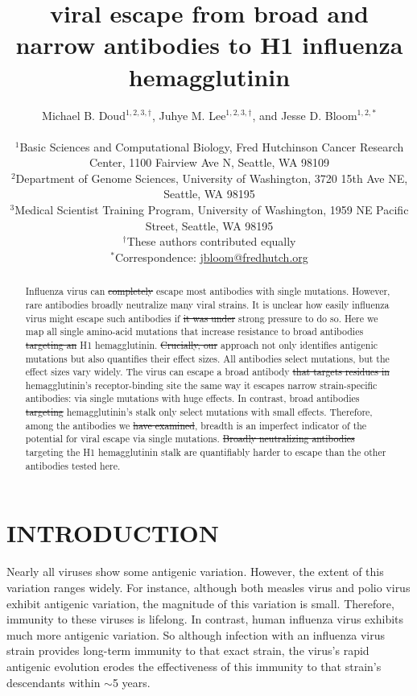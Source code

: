 \documentclass[11pt]{article}
\title{\DIFdelbegin \DIFdel{Quantifying the effects of single mutations on }\DIFdelend \DIFaddbegin \DIFadd{How single mutations affect }\DIFaddend viral escape from broad and narrow antibodies to \DIFdelbegin \DIFdel{an }\DIFdelend H1 influenza hemagglutinin}
\author
{Michael B. Doud$^{1,2,3,\dagger}$, Juhye M. Lee$^{1,2,3,\dagger}$, and Jesse D. Bloom$^{1,2,*}$\\
\\
\scriptsize{$^1$Basic Sciences and Computational Biology, Fred Hutchinson Cancer Research Center, 1100 Fairview Ave N, Seattle, WA  98109}\\ %
\scriptsize{$^2$Department of Genome Sciences, University of Washington, 3720 15th Ave NE, Seattle, WA  98195} \\ %
\scriptsize{$^3$Medical Scientist Training Program, University of Washington, 1959 NE Pacific Street, Seattle, WA  98195} \\ %
\scriptsize{$^{\dagger}$These authors contributed equally} \\
\scriptsize{$^*$Correspondence: \href{jbloom@fredhutch.org}{jbloom@fredhutch.org}}
}
\date{}
\providecommand{\DIFaddtex}[1]{{\protect\color{blue}\uwave{#1}}} %
\providecommand{\DIFdeltex}[1]{{\protect\color{red}\sout{#1}}}                      %
\providecommand{\DIFaddbegin}{} %
\providecommand{\DIFaddend}{} %
\providecommand{\DIFdelbegin}{} %
\providecommand{\DIFdelend}{} %
\providecommand{\DIFadd}[1]{\texorpdfstring{\DIFaddtex{#1}}{#1}} %
\providecommand{\DIFdel}[1]{\texorpdfstring{\DIFdeltex{#1}}{}} %
\begin{document}
\maketitle
\onehalfspacing

\begin{abstract}
Influenza virus can \DIFdelbegin \DIFdel{completely }\DIFdelend escape most antibodies with single mutations.
However, rare antibodies broadly neutralize many viral strains.
It is unclear how easily influenza virus might escape such antibodies if \DIFdelbegin \DIFdel{it was under }\DIFdelend \DIFaddbegin \DIFadd{there was }\DIFaddend strong pressure to do so.
Here we map all single amino-acid mutations that increase resistance to broad antibodies \DIFdelbegin \DIFdel{targeting an }\DIFdelend \DIFaddbegin \DIFadd{to }\DIFaddend H1 hemagglutinin.
\DIFdelbegin \DIFdel{Crucially, our }\DIFdelend \DIFaddbegin \DIFadd{Our }\DIFaddend approach not only identifies antigenic mutations but also quantifies their effect sizes.
All antibodies select mutations, but the effect sizes vary widely. 
The virus can escape a broad antibody \DIFdelbegin \DIFdel{that targets residues in }\DIFdelend \DIFaddbegin \DIFadd{to }\DIFaddend hemagglutinin's receptor-binding site the same way it escapes narrow strain-specific antibodies: via single mutations with huge effects.   
In contrast, broad antibodies \DIFdelbegin \DIFdel{targeting }\DIFdelend \DIFaddbegin \DIFadd{to }\DIFaddend hemagglutinin's stalk only select mutations with small effects. 
Therefore, among the antibodies we \DIFdelbegin \DIFdel{have examined}\DIFdelend \DIFaddbegin \DIFadd{examine}\DIFaddend , breadth is an imperfect indicator of the potential for viral escape via single mutations.
\DIFdelbegin \DIFdel{Broadly neutralizing antibodies }\DIFdelend \DIFaddbegin \DIFadd{Antibodies }\DIFaddend targeting the H1 hemagglutinin stalk are quantifiably harder to escape than the other antibodies tested here.
\end{abstract}

\section*{INTRODUCTION}
Nearly all viruses show some antigenic variation.
However, the extent of this variation ranges widely.
For instance, although both measles virus\cite{birrer1981antigenic,ter1981antigenic} and polio virus\cite{crainic1983natural,diamond1985antigenic,drexler2014robustness} exhibit antigenic variation, the magnitude of this variation is small. 
Therefore, immunity to these viruses is lifelong\cite{panum1847iagttagelser,salk1984one}.
In contrast, human influenza virus exhibits much more antigenic variation.
So although infection with an influenza virus strain provides long-term immunity to that exact strain\cite{fluinboardingschool1978,davies1982christ,yu2008neutralizing}, the virus's rapid antigenic evolution erodes the effectiveness of this immunity to that strain's descendants within $\sim$5 years\cite{couch1983immunity,kucharski2015estimating}.
\end{document}
